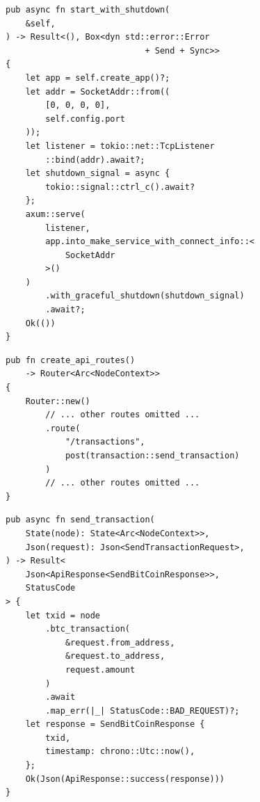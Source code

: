\begin{listing}[htbp]
\caption{Web server startup ()}
\label{lst:9-9-5}
\begin{verbatim}
pub async fn start_with_shutdown(
    &self,
) -> Result<(), Box<dyn std::error::Error
                            + Send + Sync>>
{
    let app = self.create_app()?;
    let addr = SocketAddr::from((
        [0, 0, 0, 0],
        self.config.port
    ));
    let listener = tokio::net::TcpListener
        ::bind(addr).await?;
    let shutdown_signal = async {
        tokio::signal::ctrl_c().await?
    };
    axum::serve(
        listener,
        app.into_make_service_with_connect_info::<
            SocketAddr
        >()
    )
        .with_graceful_shutdown(shutdown_signal)
        .await?;
    Ok(())
}
\end{verbatim}
\end{listing}

\begin{listing}[htbp]
\caption{Route mapping: POST }
\label{lst:9-9-6}
\begin{verbatim}
pub fn create_api_routes()
    -> Router<Arc<NodeContext>>
{
    Router::new()
        // ... other routes omitted ...
        .route(
            "/transactions",
            post(transaction::send_transaction)
        )
        // ... other routes omitted ...
}
\end{verbatim}
\end{listing}

\begin{listing}[htbp]
\caption{HTTP handler: }
\label{lst:9-9-7}
\begin{verbatim}
pub async fn send_transaction(
    State(node): State<Arc<NodeContext>>,
    Json(request): Json<SendTransactionRequest>,
) -> Result<
    Json<ApiResponse<SendBitCoinResponse>>,
    StatusCode
> {
    let txid = node
        .btc_transaction(
            &request.from_address,
            &request.to_address,
            request.amount
        )
        .await
        .map_err(|_| StatusCode::BAD_REQUEST)?;
    let response = SendBitCoinResponse {
        txid,
        timestamp: chrono::Utc::now(),
    };
    Ok(Json(ApiResponse::success(response)))
}
\end{verbatim}
\end{listing}

